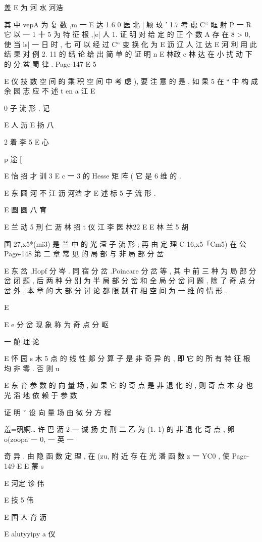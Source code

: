 {{{{{{{{{{盖 E 为 河 水 河浩

其 中 vepA 为 复 数 ,m 一
E 达
1 6
0 医 北
[ 颖
玟
' 1.7 考 虑 C“ 眶 射 P 一 R 它 以 一 1 十 5 为 特 征 根 ,|e| 人 1. 证 明 对
给 定 的 正 个 数 A 存 在 8 > 0, 使 当 ls| 一 日 时 , 七 可 以 经 过 C“ 变 换 化 为
E 沥 辽 人 江 达
E 河
利 用 此 结 果 对 例 2. 11 的 结 论 给 出 简 单 的 证 明
n
E 林政 c 林 达
在 小 扰 动 下 的 分 盆 蜀 律 .
Page-147
E 5

E 仪 技
数 空 间 的 乘 积 空 间 中 考 虑 ), 要 注 意 的 是 , 如 果 5 在 “ 中 构 成 余
园 志 应 不 述
t en a 江
E

0
子 流 形 . 记

E 人 沥
E 扬 八

2 着 李 5
E 心

p 途 [

E 怡 招 才 训
3
E c 一 3
的 Hesse 矩 阵 ( 它 是 6 维 的 .

E 东 圆 河 不 江 沥 河浩 才
E 述 标 5
子 流 形 .

E 圆 圆 八 育

E 兰 动 5 刑 仁 沥 林 招 t 仪 江 李
医 林22
E
E 林 兰 5 胡

国
27,x5*(mi3) 是 兰 中 的 光 滢 子 流 形 ; 再 由 定 理 C 16,x5「Cm5) 在 公
Page-148
第 二 章 常 见 的 局 部 与 非 局 部 分 岔

E 东
岔 ,Hopf 分 岑 . 同 宿 分 岔 .Poincare 分 岔 等 , 其 中 前 三 种 为 局 部 分 岔
闭 题 , 后 两 种 分 别 为 半 局 部 分 岔 和 全 局 分 岔 问 题 , 除 了 奇 点 分 岔
外 , 本 章 的 大 部 分 讨 论 都 限 制 在 相 空 间 为 一 维 的 情 形 .

E

E
e
分 岔 现 象 称 为 奇 点 分 岖

一 舱 理 论

E 怀 园 s 木 5
点 的 线 性 郯 分 算 子 是 非 奇 异 的 , 即 它 的 所 有 特 征 根 均 非 零 . 否 则
u

E 东 育 参 数 的 向 量 场 , 如 果 它 的 奇
点 是 非 退 化 的 , 则 奇 点 本 身 也 光 滔 地 依 赖 于 参 数

证 明 ˇ 设 向 量 场 由 微 分 方 程

羞=矾婀… 许
巴 沥 2 一 诚 扬 史 刑
二 乙 为 (1. 1) 的 非 退 化 奇 点 , 卵 o(zoopa 一 0, 一 英 一

奇 异 . 由 隐 函 数 定 理 , 在 (zu, 附 近 存 在 光 潘 函 数 z 一 YC0 , 使
Page-149
E E 蒙 s

E 河定 诊 伟

E 技 5 伟

E 国 人 育 沥

E alutyyipy a 仪

}}}}}}}}}}
